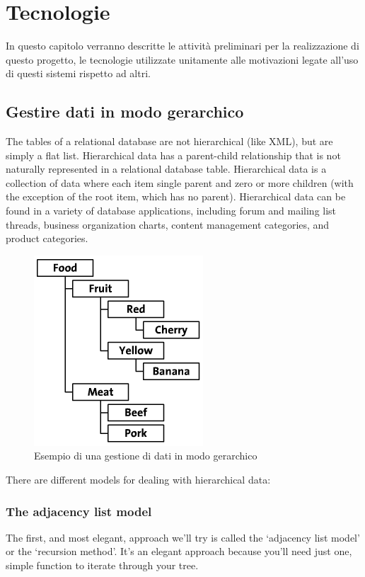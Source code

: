 \chapter{Tecnologie}
In questo capitolo verranno descritte le attività preliminari per la realizzazione di questo progetto, le tecnologie utilizzate
unitamente alle motivazioni legate all'uso di questi sistemi rispetto ad altri.

\section{Gestire dati in modo gerarchico}
The tables of a relational database are not hierarchical (like XML), but are simply a flat list. Hierarchical data has a parent-child 
relationship that is not naturally represented in a relational database table. Hierarchical data is a collection of data where each item 
single parent and zero or more children (with the exception of the root item, which has no parent). Hierarchical data can be found in 
a variety of database applications, including forum and mailing list threads, business organization charts, content management 
categories, and product categories.
\begin{figure}[!htbp]
    \centering
	\includegraphics[scale=0.7]{images/Hierarchical_Data_ex.PNG}
	\caption{Esempio di una gestione di dati in modo gerarchico}
\end{figure}

\newpage

There are different models for dealing with hierarchical data:

\subsection{The adjacency list model}
The first, and most elegant, approach we’ll try is called the ‘adjacency list model’ or the ‘recursion method’. It’s an elegant approach 
because you’ll need just one, simple function to iterate through your tree.


